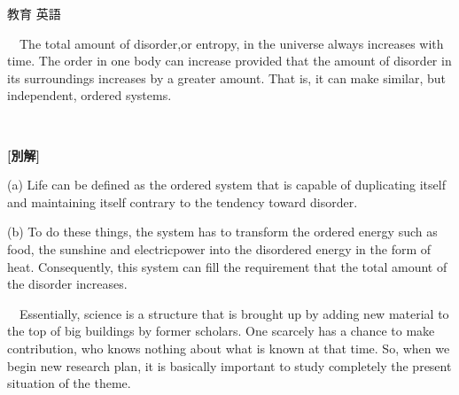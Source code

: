 \documentclass[fleqn]{jbook}
\begin{document}
\begin{answer}{教育 英語}{}
\begin{subanswers}
\begin{subsubanswers}
  \end{subsubanswers}



\SubAnswer
\baselineskip=12pt

   　The total amount of disorder,or entropy, in the universe always
   increases with time. The order in one body can
   increase provided that the amount of disorder in its surroundings
   increases by a greater amount.  That is, it can make similar,
   but independent, ordered systems. 


 {\bf [別解]}

  (a) Life can be defined as the ordered system that is capable of
  duplicating itself and maintaining itself contrary to the tendency
  toward disorder.

  (b) To do these things, the system has to transform the ordered energy
  such as food, the sunshine and electricpower into the disordered
  energy in the form of heat. Consequently, this system can fill the
  requirement that the total amount of the disorder increases.



\SubAnswer
  　Essentially, science is a structure that is brought up by adding
  new material to the top of big buildings by former scholars. One
  scarcely has a chance to make contribution, who knows nothing about
  what is known at that time. So, when we begin new research plan, it
  is basically important to study completely the present situation of
  the theme.

\baselineskip=15pt
\end{subanswers}
\end{answer}
\end{document}
